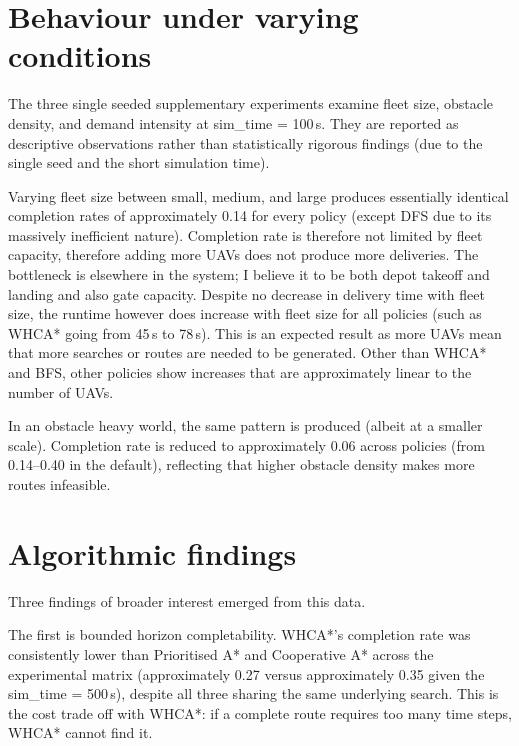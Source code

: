 \vspace{1em}

\section{Behaviour under varying conditions}
\label{sec:results-variation}

The three single seeded supplementary experiments examine fleet size, obstacle density, and demand intensity at sim\_time = 100\,s. They are reported as descriptive observations rather than statistically rigorous findings (due to the single seed and the short simulation time).\par

\vspace{1em}

Varying fleet size between small, medium, and large produces essentially identical completion rates of approximately 0.14 for every policy (except DFS due to its massively inefficient nature). Completion rate is therefore not limited by fleet capacity, therefore adding more UAVs does not produce more deliveries. The bottleneck is elsewhere in the system; I believe it to be both depot takeoff and landing and also gate capacity. Despite no decrease in delivery time with fleet size, the runtime however does increase with fleet size for all policies (such as WHCA* going from 45\,s to 78\,s). This is an expected result as more UAVs mean that more searches or routes are needed to be generated. Other than WHCA* and BFS, other policies show increases that are approximately linear to the number of UAVs.

In an obstacle heavy world, the same pattern is produced (albeit at a smaller scale). Completion rate is reduced to approximately 0.06 across policies (from 0.14--0.40 in the default), reflecting that higher obstacle density makes more routes infeasible.\par

\vspace{1em}

\section{Algorithmic findings}
\label{sec:results-findings}

Three findings of broader interest emerged from this data.

The first is bounded horizon completability. WHCA*'s completion rate was consistently lower than Prioritised A* and Cooperative A* across the experimental matrix (approximately 0.27 versus approximately 0.35 given the sim\_time = 500\,s), despite all three sharing the same underlying search. This is the cost trade off with WHCA*: if a complete route requires too many time steps, WHCA* cannot find it. \par

